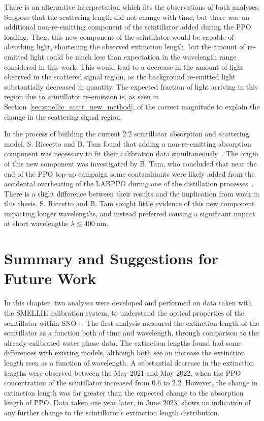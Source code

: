There is an alternative interpretation which fits the observations of both analyses. Suppose that the scattering length did not change with time, but there was an additional non-re-emitting component of the scintillator added during the PPO loading. Then, this new component of the scintillator would be capable of absorbing light, shortening the observed extinction length, but the amount of re-emitted light could be much less than expectation in the wavelength range considered in this work. This would lead to a decrease in the amount of light observed in the scattered signal region, as the background re-emitted light substantially decreased in quantity. The expected fraction of light arriving in this region due to scintillator re-emission is, as seen in Section~\ref{sec:smellie_scatt_new_method}, of the correct magnitude to explain the change in the scattering signal region.

In the process of building the current \SI{2.2}{\gpl} scintillator absorption and scattering model, S. Riccetto and B. Tam found that adding a non-re-emitting absorption component was necessary to fit their calibration data simultaneously~\cite{kaptanogluDocumentationAttenuationStudies2022}. %
The origin of this new component was investigated by B. Tam, who concluded that near the end of the PPO top-up campaign some contaminants were likely added from the accidental overheating of the LABPPO during one of the distillation processes~\cite{}. %
There is a slight difference between their results and the implication from work in this thesis. S. Riccetto and B. Tam sought little evidence of this new component impacting longer wavelengths, and instead preferred causing a significant impact at short wavelengths $\lambda\lesssim\SI{400}{\nm}$.

\section{Summary and Suggestions for Future Work}
In this chapter, two analyses were developed and performed on data taken with the SMELLIE calibration system, to understand the optical properties of the scintillator within SNO+. The first analysis measured the extinction length of the scintillator as a function both of time and wavelength, through comparison to the already-calibrated water phase data. The extinction lengths found had some differences with existing models, although both see an increase the extinction length seen as a function of wavelength. A substantial decrease in the extinction lengths were observed between the May 2021 and May 2022, when the PPO concentration of the scintillator increased from \SI{0.6}{\gpl} to \SI{2.2}{\gpl}. However, the change in extinction length was far greater than the expected change to the absorption length of PPO. Data taken one year later, in June 2023, shows no indication of any further change to the scintillator's extinction length distribution.

